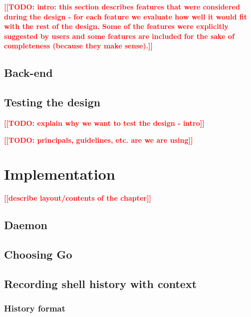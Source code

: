 \documentclass[thesis=M,english]{FITthesis}[2012/10/20]
\newcommand{\todotext}[1]{\textcolor{red}{\textbf{[[#1]]}}}
\newcommand{\blind}[1][1]{\textcolor{mygray}{\Blindtext[#1][1]}}
\begin{document}
\todotext{TODO: intro: this section describes features that were considered during the design - for each feature we evaluate how well it would fit with the rest of the design. Some of the features were explicitly suggested by users and some features are included for the sake of completeness (because they make sense).}



\section{Back-end}

\blind

\section{Testing the design}

\todotext{TODO: explain why we want to test the design - intro}

\todotext{TODO: principals, guidelines, etc. are we are using}

\blind[3]

\chapter{Implementation}
\todotext{describe layout/contents of the chapter}

\blind

\section{Daemon}

\blind

\section{Choosing Go}

\blind[3]

\section{Recording shell history with context}

\blind

\subsection{History format}
\end{document}
